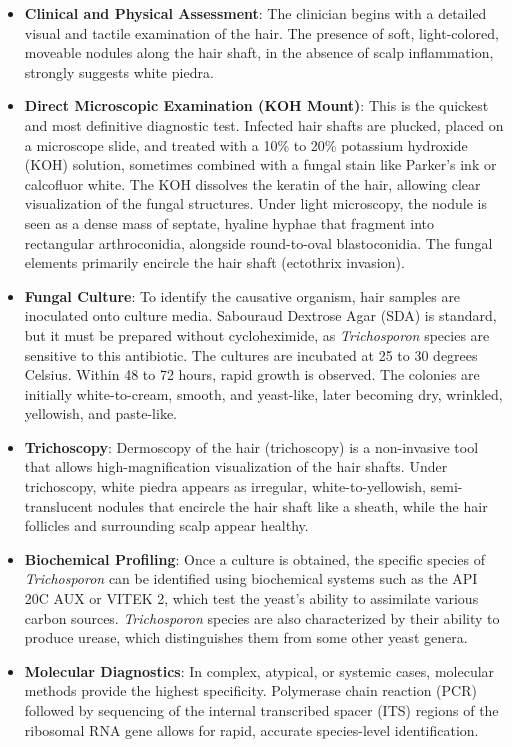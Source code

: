 \begin{itemize}
    \item \textbf{Clinical and Physical Assessment}: The clinician begins with a detailed visual and tactile examination of the hair. The presence of soft, light-colored, moveable nodules along the hair shaft, in the absence of scalp inflammation, strongly suggests white piedra.
    \item \textbf{Direct Microscopic Examination (KOH Mount)}: This is the quickest and most definitive diagnostic test. Infected hair shafts are plucked, placed on a microscope slide, and treated with a 10\% to 20\% potassium hydroxide (KOH) solution, sometimes combined with a fungal stain like Parker's ink or calcofluor white. The KOH dissolves the keratin of the hair, allowing clear visualization of the fungal structures. Under light microscopy, the nodule is seen as a dense mass of septate, hyaline hyphae that fragment into rectangular arthroconidia, alongside round-to-oval blastoconidia. The fungal elements primarily encircle the hair shaft (ectothrix invasion).
    \item \textbf{Fungal Culture}: To identify the causative organism, hair samples are inoculated onto culture media. Sabouraud Dextrose Agar (SDA) is standard, but it must be prepared without cycloheximide, as \textit{Trichosporon} species are sensitive to this antibiotic. The cultures are incubated at 25 to 30 degrees Celsius. Within 48 to 72 hours, rapid growth is observed. The colonies are initially white-to-cream, smooth, and yeast-like, later becoming dry, wrinkled, yellowish, and paste-like.
    \item \textbf{Trichoscopy}: Dermoscopy of the hair (trichoscopy) is a non-invasive tool that allows high-magnification visualization of the hair shafts. Under trichoscopy, white piedra appears as irregular, white-to-yellowish, semi-translucent nodules that encircle the hair shaft like a sheath, while the hair follicles and surrounding scalp appear healthy.
    \item \textbf{Biochemical Profiling}: Once a culture is obtained, the specific species of \textit{Trichosporon} can be identified using biochemical systems such as the API 20C AUX or VITEK 2, which test the yeast's ability to assimilate various carbon sources. \textit{Trichosporon} species are also characterized by their ability to produce urease, which distinguishes them from some other yeast genera.
    \item \textbf{Molecular Diagnostics}: In complex, atypical, or systemic cases, molecular methods provide the highest specificity. Polymerase chain reaction (PCR) followed by sequencing of the internal transcribed spacer (ITS) regions of the ribosomal RNA gene allows for rapid, accurate species-level identification.
\end{itemize}

